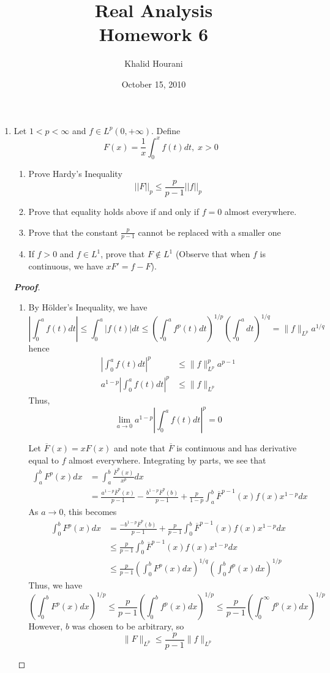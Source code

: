 \documentclass[12pt,leqno]{book}
\title{Real Analysis\\\large Homework 6}
\date{October 15, 2010}
\author{Khalid Hourani}
\theoremstyle{definition}
\newenvironment{Proof}{\begin{proof}[\textnormal{\textbf{Proof}}]}{\end{proof}}
\begin{document}
\begin{titlepage}
 \maketitle 
\end{titlepage}

\begin{enumerate}
 \item Let $1<p<\infty$ and $f \in L^p(0,+\infty)$.  Define \[F(x)=\frac{1}{x}\int_0^xf(t)dt,\;x>0\]
  \begin{enumerate} 
   \item Prove Hardy's Inequality $$||F||_p \leq \frac p{p-1}||f||_p$$ 
   \item Prove that equality holds above if and only if $f = 0$ almost everywhere.
   \item Prove that the constant $\frac p{p-1}$ cannot be replaced with a smaller one
   \item If $f>0$ and $f \in L^1$, prove that $F \not\in L^1$ (Observe that when $f$ is continuous, we have $xF' = f-F$).
  \end{enumerate}

\begin{Proof}
 \begin{enumerate}
  \item By H\"{o}lder's Inequality, we have \[\left|\int_0^af(t)dt\right|\leq\int_0^a|f(t)|dt\leq\left(\int_0^af^p(t)dt\right)^{1/p}\left(\int_0^adt\right)^{1/q}=\|f\|_{L^p}a^{1/q}\] hence \begin{align*}\left|\int_0^af(t)dt\right|^p&\leq\|f\|^p_{L^p}a^{p-1}\\a^{1-p}\left|\int_0^af(t)dt\right|^p&\leq\|f\|_{L^p}\end{align*} Thus, \[\lim_{a\to0}a^{1-p}\left|\int_0^af(t)dt\right|^p=0\] 

Let $\overline{F}(x)=xF(x)$ and note that $\overline{F}$ is continuous and has derivative equal to $f$ almost everywhere. Integrating by parts, we see that \begin{align*}\int_a^bF^p(x)dx&=\int_a^b\frac{\overline{F}^p(x)}{x^p}dx\\&=\frac{a^{1-p}\overline{F}^p(x)}{p-1}-\frac{b^{1-p}\overline{F}^p(b)}{p-1}+\frac{p}{1-p}\int_a^b\overline{F}^{p-1}(x)f(x)x^{1-p}dx\end{align*} As $a\to0$, this becomes \begin{align*}\int_0^bF^p(x)dx&=\frac{-b^{1-p}\overline{F}^p(b)}{p-1}+\frac{p}{p-1}\int_0^b\overline{F}^{p-1}(x)f(x)x^{1-p}dx\\&\leq\frac{p}{p-1}\int_0^b\overline{F}^{p-1}(x)f(x)x^{1-p}dx\\&\leq\frac{p}{p-1}\left(\int_0^bF^p(x)dx\right)^{1/q}\left(\int_0^bf^p(x)dx\right)^{1/p}\end{align*} Thus, we have \[\left(\int_0^bF^p(x)dx\right)^{1/p}\leq\frac{p}{p-1}\left(\int_0^bf^p(x)dx\right)^{1/p}\leq\frac{p}{p-1}\left(\int_0^{\infty}f^p(x)dx\right)^{1/p}\] However, $b$ was chosen to be arbitrary, so \[\|F\|_{L^p}\leq\frac{p}{p-1}\|f\|_{L^p}\]
 \end{enumerate}


\end{Proof}
\end{enumerate}
\end{document}
